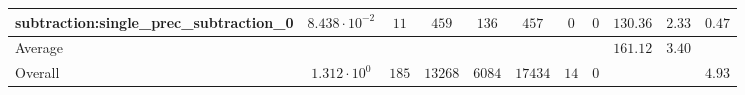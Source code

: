 \begin{tabular}{|l|c|c|c|c|c|c|c|c|c|c|}
subtraction:single\_prec\_subtraction\_0         & $ 8.438 \cdot 10^{-2} $ & $ 11     $ & $ 459   $ & $ 136  $ & $ 457   $ & $ 0  $ & $ 0 $ & $ 130.36      $ & $ 2.33    $ & $ 0.47    $ \\
\hline
Average                                          & $                     $ & $        $ & $       $ & $      $ & $       $ & $    $ & $   $ & $ 161.12      $ & $ 3.40    $ & $         $ \\
\hline
Overall                                          & $ 1.312 \cdot 10^{0}  $ & $ 185    $ & $ 13268 $ & $ 6084 $ & $ 17434 $ & $ 14 $ & $ 0 $ & $             $ & $         $ & $ 4.93    $ \\
\hline
\end{tabular}
